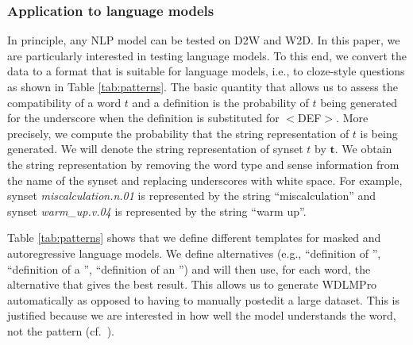 \documentclass[11pt,a4paper]{article}
\begin{document}
\subsubsection{Application to language models}
In principle, any NLP model can be tested on D2W and W2D.
In this paper, we are particularly
interested in testing language models. To this end, we 
convert the data to a format that is suitable for language
models, i.e., to cloze-style questions as
shown in Table
\ref{tab:patterns}. The basic quantity that allows us to
assess the compatibility of a word $t$ and a definition is the
probability of
$t$ being generated for 
the underscore when the definition is substituted for $<$DEF$>$.
More precisely, we compute the probability that the string
representation of $t$ is being generated.
We will denote the string representation of synset $t$ by
$\bm{t}$. 
We obtain the string representation by removing
the word type and sense information from the name of the
synset and replacing underscores with white space. For
example, synset \emph{miscalculation.n.01} is represented by
the string ``miscalculation'' and synset
\emph{warm\_up.v.04} is represented by the string ``warm
up''.

Table
\ref{tab:patterns}
shows
that we define different templates for masked
and autoregressive language models. We define alternatives
(e.g., ``definition of \underline{\hspace{3mm}}'', 
``definition of a \underline{\hspace{3mm}}'', 
``definition of an \underline{\hspace{3mm}}'') and will then
use, for each word, the alternative that gives the best
result. This allows us to generate  WDLMPro automatically as
opposed to having to manually postedit a large dataset.
This is justified because we are interested in
how well the model understands the word, not the pattern (cf.\  ). 



\end{document}
